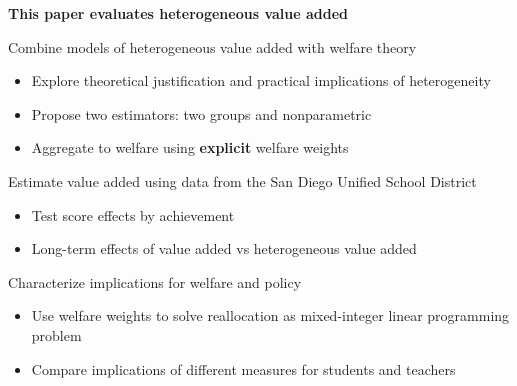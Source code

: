 \documentclass[t,aspectratio=169,11pt,presentation]{beamer}
\newenvironment{wideitemize}{\itemize\addtolength{\itemsep}{14pt}}{\enditemize}
\begin{document}
\begin{frame}{\textbf{This paper evaluates heterogeneous value added}}

\begin{wideitemize}
    \item Combine models of heterogeneous value added with welfare theory
    \begin{itemize}
        \item Explore theoretical justification and practical implications of heterogeneity
        \item Propose two estimators: two groups and nonparametric
        \item Aggregate to welfare using {\textbf{explicit}} welfare weights
    \end{itemize}
    \item<2-> Estimate value added using data from the San Diego Unified School District
    \begin{itemize}
        \item Test score effects by achievement
        \item Long-term effects of value added vs heterogeneous value added
    \end{itemize}
    
    \item<3-> Characterize implications for welfare and policy
    \begin{itemize}
        \item Use welfare weights to solve reallocation as  mixed-integer linear programming problem
        \item Compare implications of different measures for students and teachers
    \end{itemize}


\end{wideitemize}
\end{frame}
\end{document}
